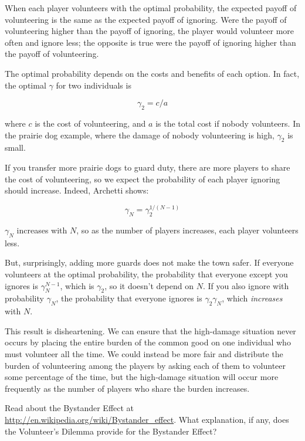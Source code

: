 \documentclass[10pt]{book}
\begin{document}
When each player volunteers with the optimal probability,
the expected payoff of volunteering is the same as the expected payoff
of ignoring.  Were the payoff of volunteering higher than the payoff
of ignoring, the player would volunteer more often and ignore less;
the opposite is true were the payoff of ignoring higher than the
payoff of volunteering.

The optimal
probability depends on the costs and benefits of each
option.  In fact, the optimal $\gamma$ for two individuals is

\[ \gamma_2 = c/a \]

where $c$ is the cost of volunteering, and $a$ is the total cost
if nobody volunteers.  In
the prairie dog example, where the damage of nobody volunteering is
high, $\gamma_2$ is small.

If you transfer more prairie dogs to guard duty, there are more
players to share the cost of volunteering, so we expect the
probability of each player ignoring should increase.  Indeed, Archetti
shows:

\[ \gamma_N = \gamma_2^{1/(N-1)} \]

$\gamma_N$ increases with
$N$, so as the number of players increases, each player volunteers
less.

But, surprisingly, adding more guards does not make the town safer.
If everyone volunteers at the optimal probability, the probability that
everyone except you ignores is $\gamma_N^{N-1}$, which is $\gamma_2$, so
it doesn't depend on $N$.  If you also ignore with probability $\gamma_N$,
the probability that everyone ignores is $\gamma_2 \gamma_N$, which
\emph{increases} with $N$.

This result is disheartening.  We can ensure that the high-damage
situation never occurs by placing the entire burden of the common good
on one individual who must volunteer all the time.  We could instead
be more fair and distribute the burden of volunteering among the
players by asking each of them to volunteer some percentage of the
time, but the high-damage situation will occur more frequently as the
number of players who share the burden increases.

\begin{exercise}

Read about the Bystander Effect at
\url{http://en.wikipedia.org/wiki/Bystander_effect}.  What
explanation, if any, does the Volunteer's Dilemma provide for the
Bystander Effect?

\end{exercise}
\end{document}
